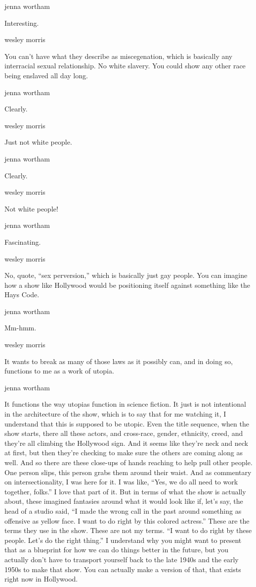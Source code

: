 jenna wortham

Interesting.

wesley morris

You can't have what they describe as miscegenation, which is basically
any interracial sexual relationship. No white slavery. You could show
any other race being enslaved all day long.

jenna wortham

Clearly.

wesley morris

Just not white people.

jenna wortham

Clearly.

wesley morris

Not white people!

jenna wortham

Fascinating.

wesley morris

No, quote, ``sex perversion,'' which is basically just gay people. You
can imagine how a show like Hollywood would be positioning itself
against something like the Hays Code.

jenna wortham

Mm-hmm.

wesley morris

It wants to break as many of those laws as it possibly can, and in doing
so, functions to me as a work of utopia.

jenna wortham

It functions the way utopias function in science fiction. It just is not
intentional in the architecture of the show, which is to say that for me
watching it, I understand that this is supposed to be utopic. Even the
title sequence, when the show starts, there all these actors, and
cross-race, gender, ethnicity, creed, and they're all climbing the
Hollywood sign. And it seems like they're neck and neck at first, but
then they're checking to make sure the others are coming along as well.
And so there are these close-ups of hands reaching to help pull other
people. One person slips, this person grabs them around their waist. And
as commentary on intersectionality, I was here for it. I was like,
``Yes, we do all need to work together, folks.'' I love that part of it.
But in terms of what the show is actually about, these imagined
fantasies around what it would look like if, let's say, the head of a
studio said, ``I made the wrong call in the past around something as
offensive as yellow face. I want to do right by this colored actress.''
These are the terms they use in the show. These are not my terms. ``I
want to do right by these people. Let's do the right thing.'' I
understand why you might want to present that as a blueprint for how we
can do things better in the future, but you actually don't have to
transport yourself back to the late 1940s and the early 1950s to make
that show. You can actually make a version of that, that exists right
now in Hollywood.

